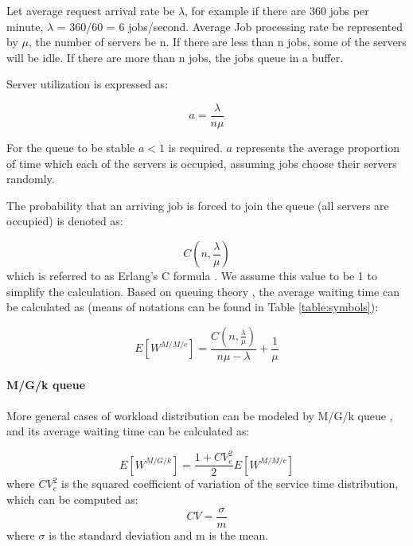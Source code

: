 Let average request arrival rate be $\lambda$, for example if there are 360 jobs per minute, $\lambda$ = 360/60 = 6 jobs/second. Average Job processing rate be represented by $\mu$, the number of servers be n. If there are less than n jobs, some of the servers will be idle. If there are more than n jobs, the jobs queue in a buffer.

Server utilization is expressed as:

\begin{equation} \label{eq:rho}
a=\frac{\lambda}{n \mu}
\end{equation}

For the queue to be stable $a < 1$ is required. $a$ represents the average proportion of time which each of the servers is occupied, assuming jobs choose their servers randomly. 

The probability that an arriving job is forced to join the queue (all servers are occupied) is denoted as:

\begin{equation} \label{eq:probability_of_waiting}
C(n,\frac{\lambda}{\mu})
\end{equation}
which is referred to as Erlang's C formula \cite{erlangc}. We assume this value to be 1 to simplify the calculation. Based on queuing theory \cite{queueing_theory}, the average waiting time can be calculated as (means of notations can be found in Table \ref{table:symbols}):

\begin{equation} \label{eq:mmcq}
E[W^{M/M/c}] = \frac{ C(n,\frac{\lambda}{\mu}) }{n \mu - \lambda}+\frac{1}{\mu} 
\end{equation}  



\paragraph{M/G/k queue}
More general cases of workload distribution can be modeled by M/G/k queue \cite{MGk_queue_wiki}, and its average waiting time can be calculated as:  

\begin{equation} \label{eq:mgkq}
E[W^{M/G/k}] = \frac{1+CV_e^2}{2} E[W^{M/M/c}]
\end{equation} where $CV_e^2$ is the squared coefficient of variation of the service time distribution, which can be computed as:
\begin{equation} \label{eq:cv}
CV=\frac{\sigma}{m}
\end{equation}
where $\sigma$ is the standard deviation and m is the mean.



